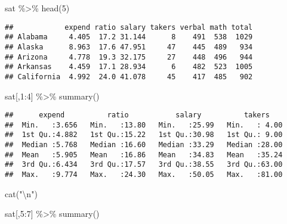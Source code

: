\documentclass[
]{article}
\newenvironment{Shaded}{\begin{snugshade}}{\end{snugshade}}
\newcommand{\DecValTok}[1]{\textcolor[rgb]{0.00,0.00,0.81}{#1}}
\newcommand{\FunctionTok}[1]{\textcolor[rgb]{0.00,0.00,0.00}{#1}}
\newcommand{\NormalTok}[1]{#1}
\newcommand{\SpecialCharTok}[1]{\textcolor[rgb]{0.00,0.00,0.00}{#1}}
\newcommand{\StringTok}[1]{\textcolor[rgb]{0.31,0.60,0.02}{#1}}
\begin{document}
\begin{Shaded}
\begin{Highlighting}[]
\NormalTok{sat }\SpecialCharTok{\%\textgreater{}\%} \FunctionTok{head}\NormalTok{(}\DecValTok{5}\NormalTok{)}
\end{Highlighting}
\end{Shaded}

\begin{verbatim}
##            expend ratio salary takers verbal math total
## Alabama     4.405  17.2 31.144      8    491  538  1029
## Alaska      8.963  17.6 47.951     47    445  489   934
## Arizona     4.778  19.3 32.175     27    448  496   944
## Arkansas    4.459  17.1 28.934      6    482  523  1005
## California  4.992  24.0 41.078     45    417  485   902
\end{verbatim}

\begin{Shaded}
\begin{Highlighting}[]
\NormalTok{sat[,}\DecValTok{1}\SpecialCharTok{:}\DecValTok{4}\NormalTok{] }\SpecialCharTok{\%\textgreater{}\%} \FunctionTok{summary}\NormalTok{()}
\end{Highlighting}
\end{Shaded}

\begin{verbatim}
##      expend          ratio           salary          takers     
##  Min.   :3.656   Min.   :13.80   Min.   :25.99   Min.   : 4.00  
##  1st Qu.:4.882   1st Qu.:15.22   1st Qu.:30.98   1st Qu.: 9.00  
##  Median :5.768   Median :16.60   Median :33.29   Median :28.00  
##  Mean   :5.905   Mean   :16.86   Mean   :34.83   Mean   :35.24  
##  3rd Qu.:6.434   3rd Qu.:17.57   3rd Qu.:38.55   3rd Qu.:63.00  
##  Max.   :9.774   Max.   :24.30   Max.   :50.05   Max.   :81.00
\end{verbatim}

\begin{Shaded}
\begin{Highlighting}[]
\FunctionTok{cat}\NormalTok{(}\StringTok{"}\SpecialCharTok{\textbackslash{}n}\StringTok{"}\NormalTok{)}
\end{Highlighting}
\end{Shaded}

\begin{Shaded}
\begin{Highlighting}[]
\NormalTok{sat[,}\DecValTok{5}\SpecialCharTok{:}\DecValTok{7}\NormalTok{] }\SpecialCharTok{\%\textgreater{}\%} \FunctionTok{summary}\NormalTok{()}
\end{Highlighting}
\end{Shaded}
\end{document}
